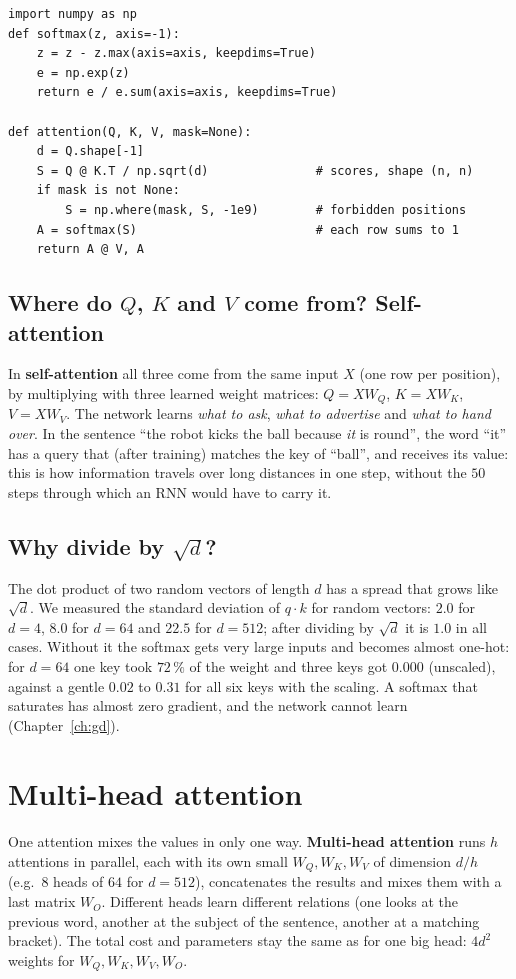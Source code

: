 \begin{verbatim}
import numpy as np
def softmax(z, axis=-1):
    z = z - z.max(axis=axis, keepdims=True)
    e = np.exp(z)
    return e / e.sum(axis=axis, keepdims=True)

def attention(Q, K, V, mask=None):
    d = Q.shape[-1]
    S = Q @ K.T / np.sqrt(d)               # scores, shape (n, n)
    if mask is not None:
        S = np.where(mask, S, -1e9)        # forbidden positions
    A = softmax(S)                         # each row sums to 1
    return A @ V, A
\end{verbatim}

\subsection*{Where do $Q$, $K$ and $V$ come from? Self-attention}
In \textbf{self-attention} all three come from the same input $X$ (one row per position), by multiplying with three learned weight matrices: $Q=XW_Q$, $K=XW_K$, $V=XW_V$. The network learns \emph{what to ask}, \emph{what to advertise} and \emph{what to hand over}. In the sentence ``the robot kicks the ball because \emph{it} is round'', the word ``it'' has a query that (after training) matches the key of ``ball'', and receives its value: this is how information travels over long distances in one step, without the $50$ steps through which an RNN would have to carry it.

\subsection*{Why divide by $\sqrt d$?}
The dot product of two random vectors of length $d$ has a spread that grows like $\sqrt d$. We measured the standard deviation of $q\cdot k$ for random vectors: $2.0$ for $d=4$, $8.0$ for $d=64$ and $22.5$ for $d=512$; after dividing by $\sqrt d$ it is $1.0$ in all cases. Without it the softmax gets very large inputs and becomes almost one-hot: for $d=64$ one key took $72\,\%$ of the weight and three keys got $0.000$ (unscaled), against a gentle $0.02$ to $0.31$ for all six keys with the scaling. A softmax that saturates has almost zero gradient, and the network cannot learn (Chapter~\ref{ch:gd}).

\section*{Multi-head attention}
One attention mixes the values in only one way. \textbf{Multi-head attention} runs $h$ attentions in parallel, each with its own small $W_Q,W_K,W_V$ of dimension $d/h$ (e.g.\ $8$ heads of $64$ for $d=512$), concatenates the results and mixes them with a last matrix $W_O$. Different heads learn different relations (one looks at the previous word, another at the subject of the sentence, another at a matching bracket). The total cost and parameters stay the same as for one big head: $4d^2$ weights for $W_Q,W_K,W_V,W_O$.

